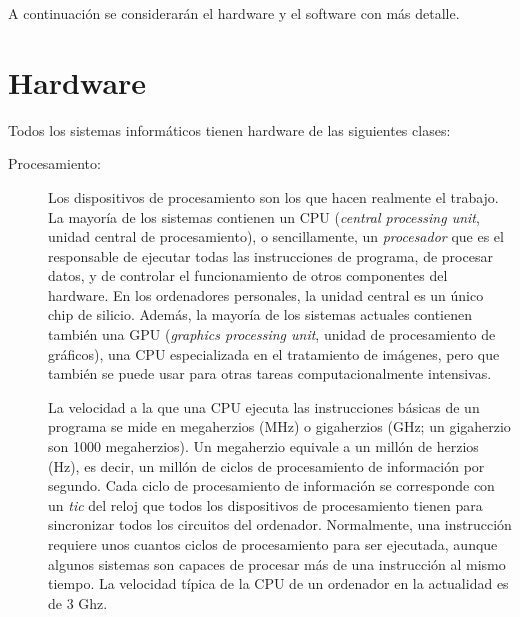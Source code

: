 A continuación se considerarán el hardware y el software con más detalle. 

\section{Hardware} 

Todos los sistemas informáticos tienen hardware de las siguientes clases: 

\begin{description} \item[Procesamiento:] Los dispositivos de procesamiento son los que hacen realmente el trabajo. La mayoría de los sistemas contienen un CPU ({\em central processing unit}, unidad central de procesamiento), o sencillamente, un \emph{procesador} que es el responsable de ejecutar todas las instrucciones de programa, de procesar datos, y de controlar el funcionamiento de otros componentes del hardware. En los ordenadores personales, la unidad central es un único chip de silicio. Además, la mayoría de los sistemas actuales contienen también una GPU (\emph{graphics processing unit}, unidad de procesamiento de gráficos), una CPU especializada en el tratamiento de imágenes, pero que también se puede usar para otras tareas computacionalmente intensivas. 

La velocidad a la que una CPU ejecuta las instrucciones básicas de un programa se mide en megaherzios (MHz) o gigaherzios (GHz; un gigaherzio son 1000 megaherzios). Un megaherzio equivale a un millón de herzios (Hz), es decir, un millón de ciclos de procesamiento de información por segundo. Cada ciclo de procesamiento de información se corresponde con un \emph{tic} del reloj que todos los dispositivos de procesamiento tienen para sincronizar todos los circuitos del ordenador. Normalmente, una instrucción requiere unos cuantos ciclos de procesamiento para ser ejecutada, aunque algunos sistemas son capaces de procesar más de una instrucción al mismo tiempo. La velocidad típica de la CPU de un ordenador en la actualidad es de 3 Ghz. 


\end{description}

